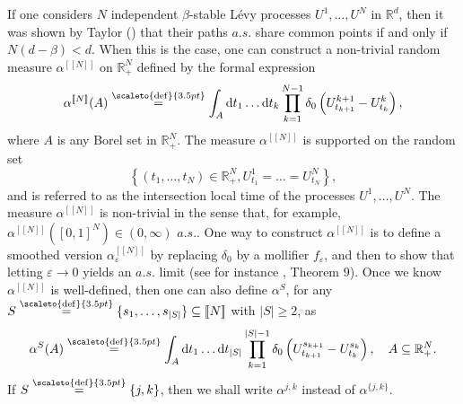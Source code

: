 \documentclass[12pt]{article}
\newcommand{\RR}{\mathbb R}
\newcommand{\1}{\mathds{1}}
\renewcommand{\d}{\mathrm d}
\newcommand{\eqdef}{\stackrel{\scaleto{\mathrm{def}}{3.5pt}}{=}}
\numberwithin{equation}{section}
\begin{document}
If one considers $N$ independent $\beta$-stable Lévy processes $U^1,\dots,U^N$ in $\RR^d$, then it was shown by Taylor (\cite{TaylorMultPointsStable1966}) that their paths $a.s.$ share common points if and only if $N(d-\beta)<d$. When this is the case, one can construct a non-trivial random measure $\alpha^{[\![N]\!]}$ on $\RR_+^N$ defined by the formal expression
\begin{equation*}
    \alpha^{[\![N]\!]}(A)\eqdef\int_A\d t_1\dots\d t_k\prod_{k=1}^{N-1}\delta_0\left(U_{t_{k+1}}^{k+1}-U_{t_k}^k\right),
\end{equation*}
where $A$ is any Borel set in $\RR_+^N$. The measure $\alpha^{[\![N]\!]}$ is supported on the random set 
\begin{equation*}
    \left\{(t_1,\dots,t_N)\in\RR_+^N, U_{t_1}^1=\dots=U_{t_N}^N\right\},
\end{equation*}
and is referred to as the intersection local time of the processes $U^1,\dots, U^N$. The measure $\alpha^{[\![N]\!]}$ is non-trivial in the sense that, for example, $\alpha^{[\![N]\!]}([0,1]^N)\in(0,\infty)$ $a.s.$. One way to construct $\alpha^{[\![N]\!]}$ is to define a smoothed version $\alpha_\varepsilon^{[\![N]\!]}$ by replacing $\delta_0$ by a mollifier $f_\varepsilon$, and then to show that letting $\varepsilon\rightarrow 0$ yields an $a.s.$ limit (see for instance \cite{ChenRosen2005}, Theorem $9$). Once we know $\alpha^{[\![N]\!]}$ is well-defined, then one can also define $\alpha^S$, for any $S\eqdef\{s_1,\dots,s_{|S|}\}\subseteq[\![N]\!]$ with $|S|\ge2$, as
\begin{equation*}
    \alpha^S(A)\eqdef\int_A\d t_1\dots\d t_{|S|}\prod_{k=1}^{|S|-1}\delta_0\left(U_{t_{k+1}}^{s_{k+1}}-U_{t_k}^{s_k}\right), \quad A\subseteq\RR_+^N.
\end{equation*}
If $S\eqdef\{j,k\}$, then we shall write $\alpha^{j,k}$ instead of $\alpha^{\{j,k\}}$.
\end{document}
